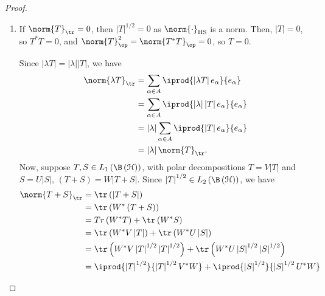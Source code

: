 \documentclass[10pt]{mypackage}
\DeclareMathOperator{\hs}{HS}
\begin{document}
\begin{proof}\hfill
  \begin{enumerate}[(1)]
    \item If $\norm{T}_{\tr} = 0$, then $\left\vert T \right\vert^{1/2} = 0$ as $\norm{\cdot}_{\hs}$ is a norm. Then, $\left\vert T \right\vert = 0$, so $T^{\ast}T = 0$, and $\norm{T}^2_{\op} = \norm{T^{\ast}T}_{\op} = 0$, so $T = 0$.\newline

      Since $\left\vert \lambda T \right\vert = \left\vert \lambda \right\vert\left\vert T \right\vert$, we have 
      \begin{align*}
        \norm{\lambda T}_{\tr} &= \sum_{\alpha\in A} \iprod{\left\vert \lambda T \right\vert e_{\alpha}}{e_{\alpha}}\\
                               &= \sum_{\alpha\in A} \iprod{\left\vert \lambda \right\vert\left\vert T \right\vert e_{\alpha}}{e_{\alpha}}\\
                               &= \left\vert \lambda \right\vert\sum_{\alpha \in A} \iprod{\left\vert T \right\vert e_{\alpha}}{e_{\alpha}}\\
                               &= \left\vert \lambda \right\vert\norm{T}_{\tr}.
      \end{align*}
      Now, suppose $T,S\in L_1\left( \B\left( \mathcal{H} \right) \right)$, with polar decompositions $T = V\left\vert T \right\vert$ and $S = U\left\vert S \right\vert$, $\left( T+S \right) = W\left\vert T+S \right\vert$. Since $\left\vert T \right\vert^{1/2}\in L_2\left( \B\left( \mathcal{H} \right) \right)$, we have
      \begin{align*}
        \norm{T + S}_{\tr} &= \tr\left( \left\vert T+S \right\vert \right)\\
                           &= \tr\left( W^{\ast}\left( T+S \right) \right)\\
                           &= Tr\left( W^{\ast}T \right) + \tr\left( W^{\ast}S \right)\\
                           &= \tr\left( W^{\ast}V\left\vert T \right\vert \right) + \tr\left( W^{\ast}U\left\vert S \right\vert \right)\\
                           &= \tr\left( W^{\ast}V\left\vert T \right\vert^{1/2}\left\vert T \right\vert^{1/2} \right) + \tr\left( W^{\ast}U\left\vert S \right\vert^{1/2}\left\vert S \right\vert^{1/2} \right)\\
                           &= \iprod{\left\vert T \right\vert^{1/2}}{\left\vert T \right\vert^{1/2}V^{\ast}W} + \iprod{\left\vert S \right\vert^{1/2}}{\left\vert S \right\vert^{1/2}U^{\ast}W}\\

\end{align*}
\end{enumerate}
\end{proof}
\end{document}
